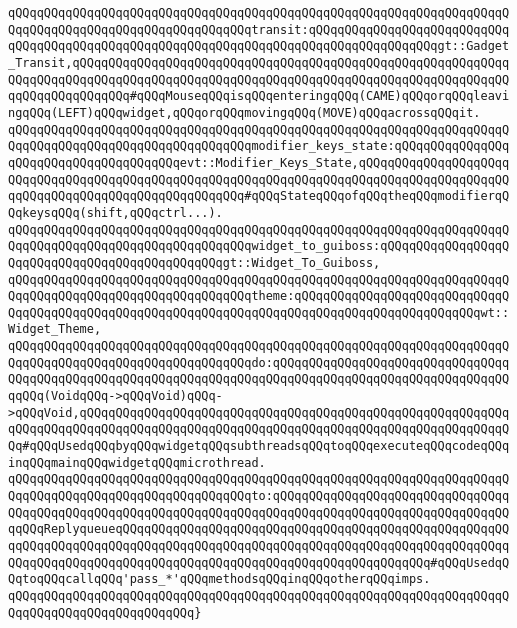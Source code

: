 \verb|qQQqqQQqqQQqqQQqqQQqqQQqqQQqqQQqqQQqqQQqqQQqqQQqqQQqqQQqqQQqqQQqqQQqqQQqqQQqqQQqqQQqqQQqqQQqqQQqqQQqqQQqtransit:qQQqqQQqqQQqqQQqqQQqqQQqqQQqqQQqqQQqqQQqqQQqqQQqqQQqqQQqqQQqqQQqqQQqqQQqqQQqqQQqqQQqqQQqgt::Gadget_Transit,qQQqqQQqqQQqqQQqqQQqqQQqqQQqqQQqqQQqqQQqqQQqqQQqqQQqqQQqqQQqqQQqqQQqqQQqqQQqqQQqqQQqqQQqqQQqqQQqqQQqqQQqqQQqqQQqqQQqqQQqqQQqqQQqqQQqqQQqqQQqqQQqqQQq#qQQqMouseqQQqisqQQqenteringqQQq(CAME)qQQqorqQQqleavingqQQq(LEFT)qQQqwidget,qQQqorqQQqmovingqQQq(MOVE)qQQqacrossqQQqit.|\newline
\verb|qQQqqQQqqQQqqQQqqQQqqQQqqQQqqQQqqQQqqQQqqQQqqQQqqQQqqQQqqQQqqQQqqQQqqQQqqQQqqQQqqQQqqQQqqQQqqQQqqQQqqQQqmodifier_keys_state:qQQqqQQqqQQqqQQqqQQqqQQqqQQqqQQqqQQqqQQqevt::Modifier_Keys_State,qQQqqQQqqQQqqQQqqQQqqQQqqQQqqQQqqQQqqQQqqQQqqQQqqQQqqQQqqQQqqQQqqQQqqQQqqQQqqQQqqQQqqQQqqQQqqQQqqQQqqQQqqQQqqQQqqQQqqQQqqQQq#qQQqStateqQQqofqQQqtheqQQqmodifierqQQqkeysqQQq(shift,qQQqctrl...).|\newline
\verb|qQQqqQQqqQQqqQQqqQQqqQQqqQQqqQQqqQQqqQQqqQQqqQQqqQQqqQQqqQQqqQQqqQQqqQQqqQQqqQQqqQQqqQQqqQQqqQQqqQQqqQQqwidget_to_guiboss:qQQqqQQqqQQqqQQqqQQqqQQqqQQqqQQqqQQqqQQqqQQqqQQqgt::Widget_To_Guiboss,|\newline
\verb|qQQqqQQqqQQqqQQqqQQqqQQqqQQqqQQqqQQqqQQqqQQqqQQqqQQqqQQqqQQqqQQqqQQqqQQqqQQqqQQqqQQqqQQqqQQqqQQqqQQqqQQqtheme:qQQqqQQqqQQqqQQqqQQqqQQqqQQqqQQqqQQqqQQqqQQqqQQqqQQqqQQqqQQqqQQqqQQqqQQqqQQqqQQqqQQqqQQqqQQqqQQqwt::Widget_Theme,|\newline
\verb|qQQqqQQqqQQqqQQqqQQqqQQqqQQqqQQqqQQqqQQqqQQqqQQqqQQqqQQqqQQqqQQqqQQqqQQqqQQqqQQqqQQqqQQqqQQqqQQqqQQqqQQqdo:qQQqqQQqqQQqqQQqqQQqqQQqqQQqqQQqqQQqqQQqqQQqqQQqqQQqqQQqqQQqqQQqqQQqqQQqqQQqqQQqqQQqqQQqqQQqqQQqqQQqqQQqqQQq(VoidqQQq->qQQqVoid)qQQq->qQQqVoid,qQQqqQQqqQQqqQQqqQQqqQQqqQQqqQQqqQQqqQQqqQQqqQQqqQQqqQQqqQQqqQQqqQQqqQQqqQQqqQQqqQQqqQQqqQQqqQQqqQQqqQQqqQQqqQQqqQQqqQQqqQQqqQQqqQQq#qQQqUsedqQQqbyqQQqwidgetqQQqsubthreadsqQQqtoqQQqexecuteqQQqcodeqQQqinqQQqmainqQQqwidgetqQQqmicrothread.|\newline
\verb|qQQqqQQqqQQqqQQqqQQqqQQqqQQqqQQqqQQqqQQqqQQqqQQqqQQqqQQqqQQqqQQqqQQqqQQqqQQqqQQqqQQqqQQqqQQqqQQqqQQqqQQqto:qQQqqQQqqQQqqQQqqQQqqQQqqQQqqQQqqQQqqQQqqQQqqQQqqQQqqQQqqQQqqQQqqQQqqQQqqQQqqQQqqQQqqQQqqQQqqQQqqQQqqQQqqQQqReplyqueueqQQqqQQqqQQqqQQqqQQqqQQqqQQqqQQqqQQqqQQqqQQqqQQqqQQqqQQqqQQqqQQqqQQqqQQqqQQqqQQqqQQqqQQqqQQqqQQqqQQqqQQqqQQqqQQqqQQqqQQqqQQqqQQqqQQqqQQqqQQqqQQqqQQqqQQqqQQqqQQqqQQqqQQqqQQqqQQqqQQqqQQq#qQQqUsedqQQqtoqQQqcallqQQq'pass_*'qQQqmethodsqQQqinqQQqotherqQQqimps.|\newline
\verb|qQQqqQQqqQQqqQQqqQQqqQQqqQQqqQQqqQQqqQQqqQQqqQQqqQQqqQQqqQQqqQQqqQQqqQQqqQQqqQQqqQQqqQQqqQQqqQQq}|\newline
